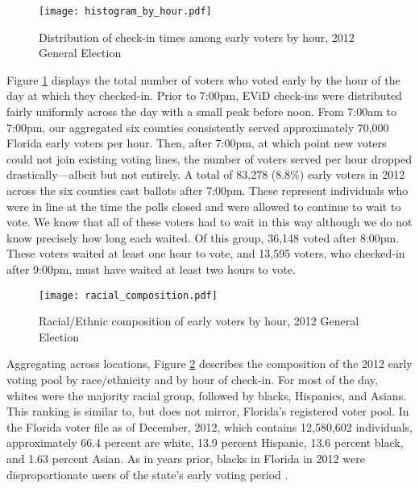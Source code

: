\documentclass[12pt,titlepage]{article}
\begin{document}
\begin{figure}[!ht]
\caption{Distribution of check-in times among early voters by hour, 2012
  General Election}
  \label{fig:hist2012}
  \centering
    \centering\texttt{[image: histogram\_by\_hour.pdf]}
\end{figure}

Figure \ref{fig:hist2012} displays the total number of voters who
voted early by the hour of the day at which they checked-in. Prior to
7:00pm, EViD check-ins were distributed fairly uniformly across the
day with a small peak before noon.  From 7:00am to 7:00pm, our
aggregated six counties consistently served approximately 70,000
Florida early voters per hour. Then, after 7:00pm, at which point new
voters could not join existing voting lines, the number of voters
served per hour dropped drastically---albeit but not entirely.  A
total of 83,278 (8.8\%) early voters in 2012 across the six counties
cast ballots after 7:00pm. These represent individuals who were in
line at the time the polls closed and were allowed to continue to wait
to vote.  We know that all of these voters had to wait in this way
although we do not know precisely how long each waited.  Of this
group, 36,148 voted after 8:00pm.  These voters waited at least one
hour to vote, and 13,595 voters, who checked-in after 9:00pm, must
have waited at least two hours to vote.




\begin{figure}[!ht]
\caption{Racial/Ethnic composition of early voters by hour, 2012 General Election}
  \label{fig:race2012}
  \centering
    \centering\texttt{[image: racial\_composition.pdf]}
\end{figure}

Aggregating across locations, Figure \ref{fig:race2012} describes the
composition of the 2012 early voting pool by race/ethnicity and by
hour of check-in.  For most of the day, whites were the majority
racial group, followed by blacks, Hispanics, and Asians.  This ranking
is similar to, but does not mirror, Florida's registered voter pool.
In the Florida voter file as of December, 2012, which contains
12,580,602 individuals, approximately 66.4 percent are white, 13.9
percent Hispanic, 13.6 percent black, and 1.63 percent Asian.  As in
years prior, blacks in Florida in 2012 were disproportionate users of
the state's early voting period \citep{herronsmith:souls}.
\end{document}
